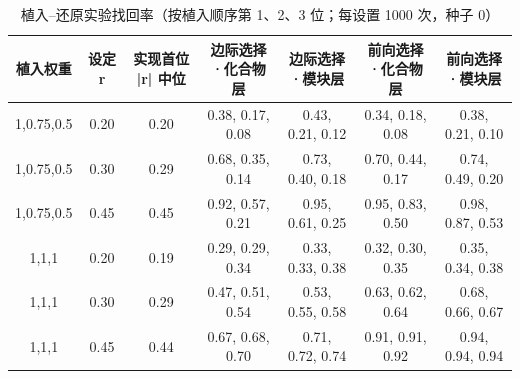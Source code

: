 \begin{table}[htbp]
\centering
\caption{植入--还原实验找回率（按植入顺序第 1、2、3 位；每设置 1000 次，种子 0）}\label{tab:q2_recovery}
\begin{tabular}{ccccccc}
\toprule
植入权重 & 设定 r & 实现首位 |r| 中位 & 边际选择·化合物层 & 边际选择·模块层 & 前向选择·化合物层 & 前向选择·模块层 \\
\midrule
1,0.75,0.5 & 0.20 & 0.20 & 0.38, 0.17, 0.08 & 0.43, 0.21, 0.12 & 0.34, 0.18, 0.08 & 0.38, 0.21, 0.10 \\
1,0.75,0.5 & 0.30 & 0.29 & 0.68, 0.35, 0.14 & 0.73, 0.40, 0.18 & 0.70, 0.44, 0.17 & 0.74, 0.49, 0.20 \\
1,0.75,0.5 & 0.45 & 0.45 & 0.92, 0.57, 0.21 & 0.95, 0.61, 0.25 & 0.95, 0.83, 0.50 & 0.98, 0.87, 0.53 \\
1,1,1 & 0.20 & 0.19 & 0.29, 0.29, 0.34 & 0.33, 0.33, 0.38 & 0.32, 0.30, 0.35 & 0.35, 0.34, 0.38 \\
1,1,1 & 0.30 & 0.29 & 0.47, 0.51, 0.54 & 0.53, 0.55, 0.58 & 0.63, 0.62, 0.64 & 0.68, 0.66, 0.67 \\
1,1,1 & 0.45 & 0.44 & 0.67, 0.68, 0.70 & 0.71, 0.72, 0.74 & 0.91, 0.91, 0.92 & 0.94, 0.94, 0.94 \\
\bottomrule
\end{tabular}
\end{table}
